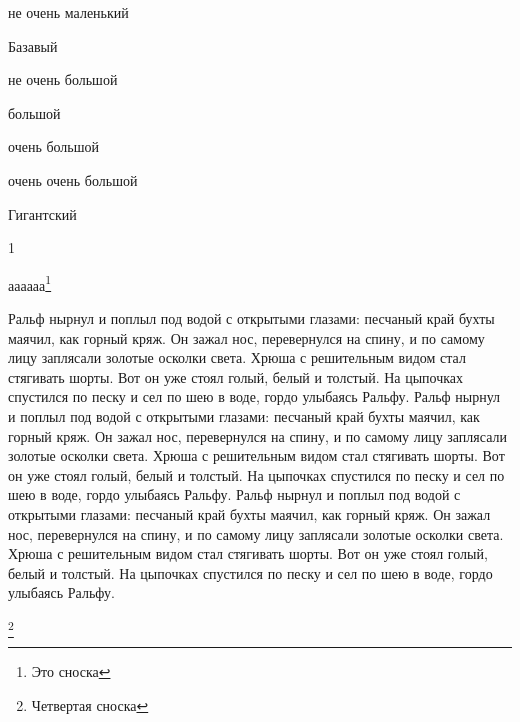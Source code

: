 \documentclass[12pt]{article}
\begin{document}
{\small не очень маленький}

{\normalsize Базавый}

{\large не очень большой }

{\Large  большой }

{\LARGE  очень большой }

{\huge  очень очень большой }

{\Huge Гигантский\footnotemark[4]}

1






аааааа\footnote{Это сноска}


{\tiny  %
	Ральф нырнул и поплыл под водой  с  открытыми  глазами:  песчаный  край
бухты  маячил,  как  горный  кряж. Он зажал нос, перевернулся на спину, и по
самому лицу заплясали золотые осколки света. Хрюша с решительным видом  стал
стягивать  шорты.  Вот  он  уже  стоял  голый,  белый и толстый. На цыпочках
спустился по песку и сел по шею в воде, гордо улыбаясь Ральфу. 
Ральф нырнул и поплыл под водой  с  открытыми  глазами:  песчаный  край
бухты  маячил,  как  горный  кряж. Он зажал нос, перевернулся на спину, и по
самому лицу заплясали золотые осколки света. Хрюша с решительным видом  стал
стягивать  шорты.  Вот  он  уже  стоял  голый,  белый и толстый. На цыпочках
спустился по песку и сел по шею в воде, гордо улыбаясь Ральфу. 
Ральф нырнул и поплыл под водой  с  открытыми  глазами:  песчаный  край
бухты  маячил,  как  горный  кряж. Он зажал нос, перевернулся на спину, и по
самому лицу заплясали золотые осколки света. Хрюша с решительным видом  стал
стягивать  шорты.  Вот  он  уже  стоял  голый,  белый и толстый. На цыпочках
спустился по песку и сел по шею в воде, гордо улыбаясь Ральфу.  
\par}
\footnote[4]{Четвертая сноска}

\tableofcontents
\end{document}
